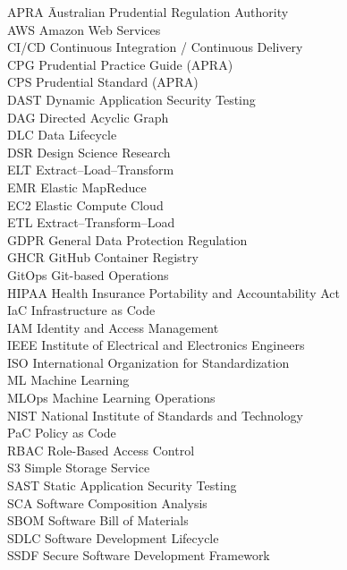 \documentclass[a4paper,oneside,phd,etd]{BYUPhys}
\begin{document}
\begin{tabbing}
APRA  \qquad\qquad \= Australian Prudential Regulation Authority\\
AWS   \> Amazon Web Services\\
CI/CD \> Continuous Integration / Continuous Delivery\\
CPG   \> Prudential Practice Guide (APRA)\\
CPS   \> Prudential Standard (APRA)\\
DAST  \> Dynamic Application Security Testing\\
DAG   \> Directed Acyclic Graph\\
DLC   \> Data Lifecycle\\
DSR   \> Design Science Research\\
ELT   \> Extract--Load--Transform\\
EMR   \> Elastic MapReduce\\
EC2   \> Elastic Compute Cloud\\
ETL   \> Extract--Transform--Load\\
GDPR  \> General Data Protection Regulation\\
GHCR  \> GitHub Container Registry\\
GitOps \> Git-based Operations\\
HIPAA \> Health Insurance Portability and Accountability Act\\
IaC   \> Infrastructure as Code\\
IAM   \> Identity and Access Management\\
IEEE  \> Institute of Electrical and Electronics Engineers\\
ISO   \> International Organization for Standardization\\
ML    \> Machine Learning\\
MLOps \> Machine Learning Operations\\
NIST  \> National Institute of Standards and Technology\\
PaC   \> Policy as Code\\
RBAC  \> Role-Based Access Control\\
S3    \> Simple Storage Service\\
SAST  \> Static Application Security Testing\\
SCA   \> Software Composition Analysis\\
SBOM  \> Software Bill of Materials\\
SDLC  \> Software Development Lifecycle\\
SSDF  \> Secure Software Development Framework\\
\end{tabbing}





\end{document}
